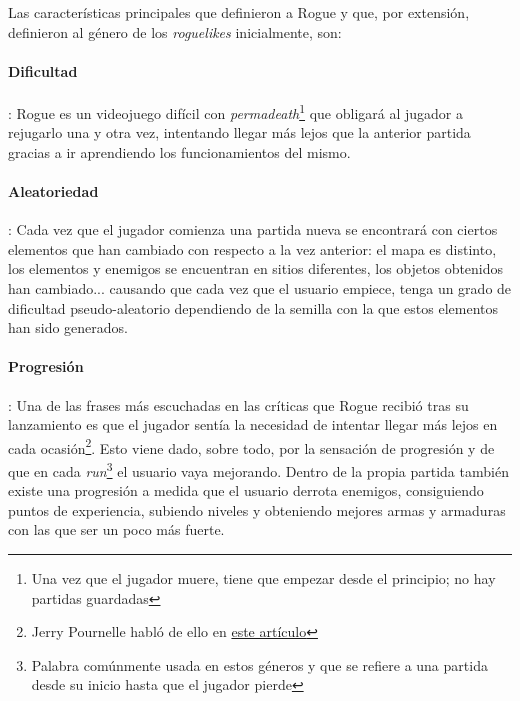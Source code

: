 Las características principales que definieron a Rogue y que, por extensión, definieron al género de los \textit{roguelikes} inicialmente, son:

\paragraph{Dificultad}: Rogue es un videojuego difícil con \textit{permadeath}\footnote{Una vez que el jugador muere, tiene que empezar desde el principio; no hay partidas guardadas} que obligará al jugador a rejugarlo una y otra vez, intentando llegar más lejos que la anterior partida gracias a ir aprendiendo los funcionamientos del mismo.

\paragraph{Aleatoriedad}: Cada vez que el jugador comienza una partida nueva se encontrará con ciertos elementos que han cambiado con respecto a la vez anterior: el mapa es distinto, los elementos y enemigos se encuentran en sitios diferentes, los objetos obtenidos han cambiado... causando que cada vez que el usuario empiece, tenga un grado de dificultad pseudo-aleatorio dependiendo de la semilla con la que estos elementos han sido generados.

\paragraph{Progresión}: Una de las frases más escuchadas en las críticas que Rogue recibió tras su lanzamiento es que el jugador sentía la necesidad de intentar llegar más lejos en cada ocasión\footnote{Jerry Pournelle habló de ello en \href{http://goo.gl/Iz2qg6}{este artículo}}. Esto viene dado, sobre todo, por la sensación de progresión y de que en cada \textit{run}\footnote{Palabra comúnmente usada en estos géneros y que se refiere a una partida desde su inicio hasta que el jugador pierde} el usuario vaya mejorando. Dentro de la propia partida también existe una progresión a medida que el usuario derrota enemigos, consiguiendo puntos de experiencia, subiendo niveles y obteniendo mejores armas y armaduras con las que ser un poco más fuerte.

